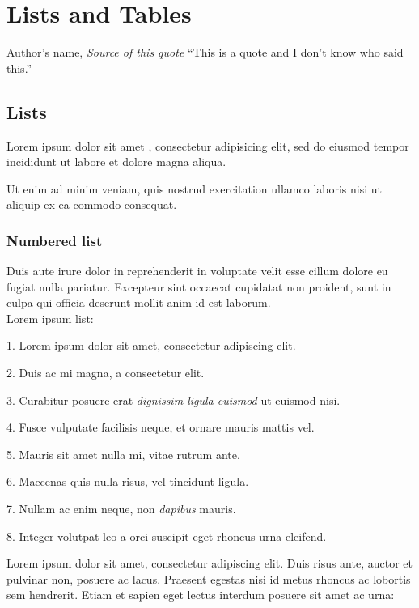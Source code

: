 \chapter{Lists and Tables}

\begin{chapquote}{Author's name, \textit{Source of this quote}}
    ``This is a quote and I don't know who said this.''
\end{chapquote}
    
\section{Lists}
Lorem ipsum dolor sit amet \citep{Ohno2007}, consectetur adipisicing elit, sed do eiusmod tempor incididunt ut labore et dolore magna aliqua.

Ut enim ad minim veniam, quis nostrud exercitation ullamco laboris nisi ut aliquip ex ea commodo consequat. 

\subsection{Numbered list}
Duis aute irure dolor in reprehenderit in voluptate velit esse cillum dolore eu fugiat nulla pariatur. Excepteur sint occaecat cupidatat non proident, sunt in culpa qui officia deserunt mollit anim id est laborum. \\ Lorem ipsum list:

1. Lorem ipsum dolor sit amet, consectetur adipiscing elit.

2. Duis ac mi magna, a consectetur elit.

3. Curabitur posuere erat \emph{dignissim ligula euismod} ut euismod nisi.

4. Fusce vulputate facilisis neque, et ornare mauris mattis vel.

5. Mauris sit amet nulla mi, vitae rutrum ante.

6. Maecenas quis nulla risus, vel tincidunt ligula.

7. Nullam ac enim neque, non \emph{dapibus} mauris.

8. Integer volutpat leo a orci suscipit eget rhoncus urna eleifend.

\noindent Lorem ipsum dolor sit amet, consectetur adipiscing elit. Duis risus ante, auctor et pulvinar non, posuere ac lacus. Praesent egestas nisi id metus rhoncus ac lobortis sem hendrerit. Etiam et sapien eget lectus interdum posuere sit amet ac urna:

